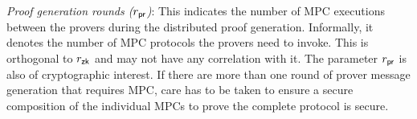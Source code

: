 \noindent\textit{Proof generation rounds ($r_\mathsf{pr}$)}:
This indicates the number of MPC executions between the provers during the distributed proof generation.  Informally, it denotes the number of MPC protocols the provers need to invoke. %
 This is orthogonal to $r_\mathsf{zk}$ and may not have any correlation with it. %
The parameter $r_\mathsf{pr}$ is also of cryptographic interest. If there are more than one round of prover message generation that requires MPC, care has to be taken to ensure a secure composition of the individual MPCs to prove the complete protocol is secure.

